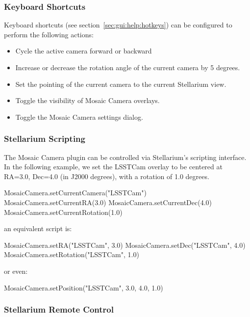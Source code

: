 \subsubsection{Keyboard Shortcuts}
\label{sec:plugins:MosaicCamera:control:keyboard}

Keyboard shortcuts (see section~\ref{sec:gui:help:hotkeys}) can be configured to perform the following actions:

\begin{itemize}
\item Cycle the active camera forward or backward
\item Increase or decrease the rotation angle of the current camera by 5 degrees.
\item Set the pointing of the current camera to the current Stellarium view.
\item Toggle the visibility of Mosaic Camera overlays.
\item Toggle the Mosaic Camera settings dialog.
\end{itemize}

\subsubsection{Stellarium Scripting}
\label{sec:plugins:MosaicCamera:control:scripting}

The Mosaic Camera plugin can be controlled via Stellarium's scripting interface.
In the following example, we set the LSSTCam overlay to be centered at RA=3.0, Dec=4.0 (in J2000 degrees), with a rotation of 1.0 degrees.

\begin{script}
  MosaicCamera.setCurrentCamera("LSSTCam")
  MosaicCamera.setCurrentRA(3.0)
  MosaicCamera.setCurrentDec(4.0)
  MosaicCamera.setCurrentRotation(1.0)
\end{script}

an equivalent script is:

\begin{script}
  MosaicCamera.setRA("LSSTCam", 3.0)
  MosaicCamera.setDec("LSSTCam", 4.0)
  MosaicCamera.setRotation("LSSTCam", 1.0)
\end{script}

or even:

\begin{script}
  MosaicCamera.setPosition("LSSTCam", 3.0, 4.0, 1.0)
\end{script}

\subsubsection{Stellarium Remote Control}
\label{sec:plugins:MosaicCamera:control:remote}

